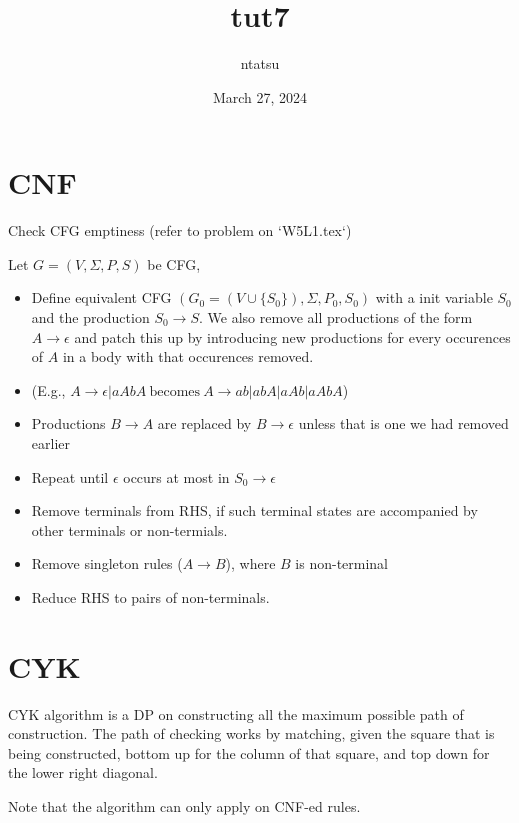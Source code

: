 \documentclass{article}
\title{tut7}
\author{ntatsu}
\date{March 27, 2024}
\theoremstyle{definition}
\theoremstyle{remark}
\begin{document}
\maketitle

\section{CNF}

Check CFG emptiness (refer to problem on `W5L1.tex`)

Let $G = (V, \Sigma, P, S)$ be CFG,

\begin{itemize}
    \item Define equivalent CFG $(G_0 = (V \cup \{S_0\}), \Sigma, P_0, S_0)$ with a init variable $S_0$ and the production $S_0 \rightarrow S$. We also remove all productions of the form $A \rightarrow \epsilon$ and patch this up by introducing new productions for every occurences of $A$ in a body with that occurences removed.
    \item (E.g., $A \rightarrow \epsilon | aAbA \ \text{becomes} \ A \rightarrow ab | abA | aAb | aAbA$)
    \item Productions $B \rightarrow A$ are replaced by $B \rightarrow \epsilon$ unless that is one we had removed earlier
    \item Repeat until $\epsilon$ occurs at most in $S_0 \rightarrow \epsilon$
    \item Remove terminals from RHS, if such terminal states are accompanied by other terminals or non-termials.
    \item Remove singleton rules ($A \rightarrow B$), where $B$ is non-terminal
    \item Reduce RHS to pairs of non-terminals.

\end{itemize}

\section{CYK}
CYK algorithm is a DP on constructing all the maximum possible path of construction.
The path of checking works by matching, given the square that is being constructed, bottom up for the column of that square, and top down for the lower right diagonal.

Note that the algorithm can only apply on CNF-ed rules.
\end{document}
